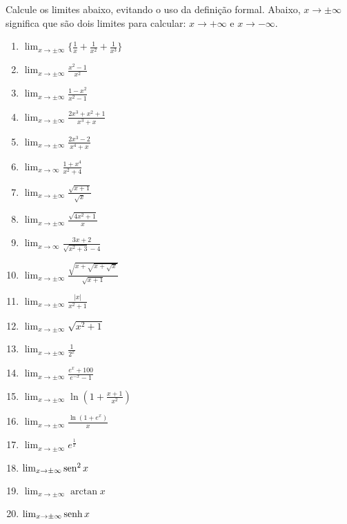 \begin{exo}\label{Exo:limitesinfini} Calcule os limites abaixo,
evitando o uso da 
definição formal. Abaixo, $x\to \pm\infty$ significa que são dois limites
para calcular: $x\to+\infty$ e $x\to-\infty$.
\begin{multicols}{3}
\begin{enumerate}
\item\label{itexliminfini2} $\lim_{x\to
\pm\infty}\{\frac{1}{x}+\frac{1}{x^2}+\frac{1}{x^3}\}$
\item\label{itexliminfini3} $\lim_{x\to \pm\infty}\frac{x^2-1}{x^2}$
\item\label{itexliminfini6} $\lim_{x\to\pm\infty}\frac{1-x^2}{x^2-1}$
\item\label{itexliminfini7} $\lim_{x\to
\pm\infty}\frac{2x^3+x^2+1}{x^3+x}$
\item\label{itexliminfini8} $\lim_{x\to
\pm\infty}\frac{2x^3-2}{x^4+x}$
\item\label{itexliminfini9} $\lim_{x\to\infty}\frac{1+x^4}{x^2+4}$
\item\label{itexliminfini10} $\lim_{x\to
\pm\infty}\frac{\sqrt{x+1}}{\sqrt{x}}$
\item\label{itexliminfini15}
$\lim_{x\to\pm\infty}\frac{\sqrt{4x^2+1}}{x}$
\item\label{itexliminfini11}
$\lim_{x\to\infty}\frac{3x+2}{\sqrt{x^2+3}-4}$
\item\label{itexliminfini12} $\lim_{x\to\pm\infty}
\frac{\sqrt{x+\sqrt{x+\sqrt{x}}}}{\sqrt{x+1}}$
\item\label{itexliminfini13} $\lim_{x\to\pm\infty}\frac{|x|}{x^2+1}$
\item\label{itexliminfini14} $\lim_{x\to\pm\infty}\sqrt{x^2+1}$
\item\label{itexliminfini141} $\lim_{x\to\pm\infty}\frac{1}{2^x}$
\item\label{itexliminfini16}
$\lim_{x\to\pm\infty}\frac{e^x+100}{e^{-x}-1}$
\item\label{itexliminfini161} $\lim_{x\to \pm \infty}\ln(1+\frac{x+1}{x^2})$
\item\label{itexliminfini162} $\lim_{x\to \pm \infty}\frac{\ln(1+e^x)}{x}$
\item\label{itexliminfini5} $\lim_{x\to\pm \infty}e^{\frac{1}{x}}$
\item\label{itexliminfini17} $\lim_{x\to \pm\infty}\operatorname{sen}^2x$
\item\label{itexliminfini19} $\lim_{x\to \pm\infty}\arctan x$
\item\label{itexliminfini20} $\lim_{x\to \pm\infty}\operatorname{senh} x$

\end{enumerate}
\end{multicols}
\end{exo}
